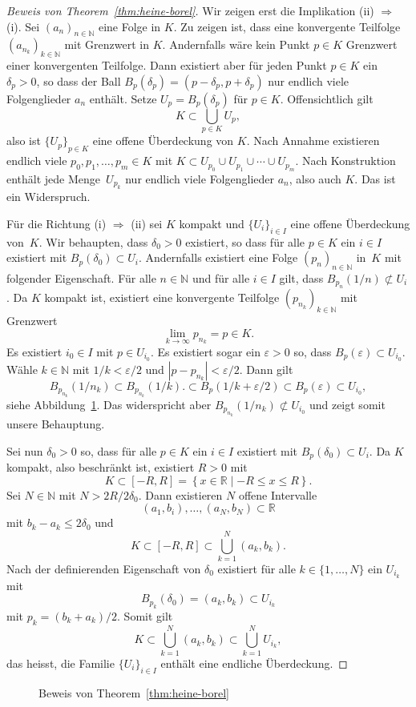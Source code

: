 \documentclass[../main.tex]{subfiles}
\begin{document}
\begin{proof}[Beweis von Theorem~\ref{thm:heine-borel}]
  Wir zeigen erst die Implikation
  (ii) $\Rightarrow$ (i). Sei
  ${(a_{n})}_{n \in \mathbb{N}}$ eine
  Folge in $K$. Zu zeigen ist, dass
  eine konvergente Teilfolge
  ${(a_{n_{k}})}_{k \in \mathbb{N}}$ 
  mit Grenzwert in $K$.
  Andernfalls wäre kein Punkt $p \in K$ 
  Grenzwert einer konvergenten Teilfolge.
  Dann existiert aber für jeden Punkt $p \in K$ 
  ein $\delta_p > 0$, so
  dass der Ball $B_p(\delta_p) = (p - \delta_p, p + \delta_p)$ 
  nur endlich viele Folgenglieder $a_n$ enthält.
  Setze  $U_p = B_{p}(\delta_p)$ für $p \in K$.
  Offensichtlich gilt
  \[
    K \subset \bigcup_{p \in K} U_p,
  \]
  also ist ${\{U_p\}}_{p \in K}$ eine offene Überdeckung
  von $K$. Nach Annahme existieren
  endlich viele $p_0, p_1, \dots, p_m \in K$ 
  mit $K \subset U_{p_0} \cup U_{p_1}
  \cup \cdots \cup U_{p_m}$.
  Nach Konstruktion enthält jede Menge~$U_{p_k}$ 
  nur endlich viele Folgenglieder
  $a_n$, also auch $K$. Das ist ein Widerspruch.
  
  Für die Richtung (i) $\Rightarrow$ (ii) sei
  $K$ kompakt und ${\{U_i\}}_{i \in I}$ eine
  offene Überdeckung von~$K$.
  Wir behaupten, dass
  $\delta_0 > 0$ existiert, so dass
  für alle $p \in K$ ein $i \in I$ existiert
  mit $B_p(\delta_0) \subset U_i$.
  Andernfalls existiert eine Folge
  ${(p_{n})}_{n \in \mathbb{N}}$ in~$K$ 
  mit folgender Eigenschaft.
  Für alle $n \in \mathbb{N}$ 
  und für alle $i \in I$ 
  gilt, dass
  $B_{p_n}(1/n) \not \subset U_i$.
  Da $K$ kompakt ist,
  existiert eine konvergente Teilfolge
  ${(p_{n_k})}_{k \in \mathbb{N}}$
   mit Grenzwert
  \[
    \lim_{k \to \infty} p_{n_k} = p \in K.
  \]
  Es existiert $i_0 \in I$ 
  mit $p \in U_{i_0}$.
  Es existiert sogar ein
  $\varepsilon > 0$ so, dass
  $B_p(\varepsilon) \subset U_{i_0}$.
  Wähle $k \in \mathbb{N}$ mit
  $1/k < \varepsilon/2$
  und $|p - p_{n_k}| < \varepsilon/2$.
  Dann gilt
  \[
    B_{p_{n_k}}(1/n_k) \subset B_{p_{n_k}}(1/k).
    \subset B_p(1/k + \varepsilon / 2)
    \subset B_p(\varepsilon) \subset U_{i_0},
  \]
  siehe Abbildung~\ref{fig:heine-borel}.
  Das widerspricht aber
  $B_{p_{n_k}}(1/n_k) \not\subset U_{i_0}$
  und zeigt somit unsere Behauptung.

  Sei nun $\delta_0 > 0$ so, dass
  für alle $p \in K$ 
  ein $i \in I$ existiert
  mit $B_p(\delta_0) \subset U_i$.
  Da $K$ kompakt, also beschränkt ist,
  existiert $R > 0$ mit \[K \subset
  [-R, R] = \left\{x \in \mathbb{R} \mid 
-R \leq x \leq R\right\}.\]
  Sei $N \in \mathbb{N}$ 
  mit $N > 2R/2\delta_0$.
  Dann existieren $N$ offene Intervalle
  \[
    (a_1, b_i), \dots, (a_N, b_N) \subset \mathbb{R}
  \]
  mit $b_k - a_k \leq 2 \delta_0$
  und
  \[
    K \subset [-R, R] \subset \bigcup_{k=1}^{N}(a_k, b_k).
  \]
  Nach der definierenden Eigenschaft von $\delta_0$
  existiert
  für alle $k \in \{1, \dots , N \}$ 
  ein $U_{i_k}$ mit
  \[
    B_{p_k}(\delta_0) = (a_k, b_k) \subset U_{i_k}
  \]
  mit $p_k = (b_k + a_k)/2$.
  Somit gilt
  \[
    K \subset \bigcup_{k=1}^{N} (a_k, b_k) \subset
    \bigcup_{k=1}^{N} U_{i_k},
  \]
  das heisst, die Familie ${\{U_i\}}_{i \in I}$ enthält
  eine endliche Überdeckung.
\end{proof}

\begin{figure}[htb]
  \centering
  
  \caption{Beweis von Theorem~\ref{thm:heine-borel}}%
  \label{fig:heine-borel}
\end{figure}
\end{document}
